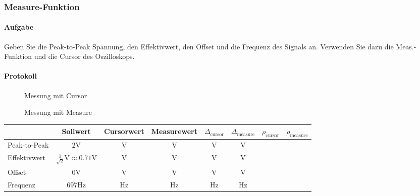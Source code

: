 \documentclass[10pt]{report}
\begin{document}
        \subsubsection{Measure-Funktion}
        \paragraph{Aufgabe}
        Geben Sie die Peak-to-Peak Spannung, den Effektivwert, den Offset und die Frequenz
        des Signals an. Verwenden Sie dazu die \glqq{}Meas.\grqq-{}Funktion und die Cursor des
        Oszilloskops.
        \paragraph{Protokoll}
        \begin{center}
            \begin{figure}[H]
              \caption{Messung mit Cursor}
            \end{figure}
        \end{center}
        \begin{center}
            \begin{figure}[H]
              \caption{Messung mit Measure}
            \end{figure}
        \end{center}
        \begin{tabular}{lccccccc}
            \toprule
             & Sollwert & Cursorwert & Measurewert & $\Delta_{\text{cursor}}$ & $\Delta_{\text{measure}}$ & $\rho_{\text{cursor}}$ & $\rho_{\text{measure}}$\\
            \midrule
            Peak-to-Peak & $2\si{\volt}$ & $\si{\volt}$ & $\si{\volt}$ & $\si{\volt}$ & $\si{\volt}$ &  & \\
            Effektivwert & $\frac{1}{\sqrt{2}}\si{\volt} \approx 0.71\si{\volt}$ & $\si{\volt}$ & $\si{\volt}$ & $\si{\volt}$ & $\si{\volt}$ &  & \\
            Offset & $0\si{\volt}$ & $\si{\volt}$ & $\si{\volt}$ & $\si{\volt}$ & $\si{\volt}$ &  & \\
            Frequenz & $697\si{\hertz}$ & $\si{\hertz}$ & $\si{\hertz}$ & $\si{\hertz}$ & $\si{\hertz}$ &  & \\
            \bottomrule
        \end{tabular}

        \vspace{0.5cm}
\end{document}
